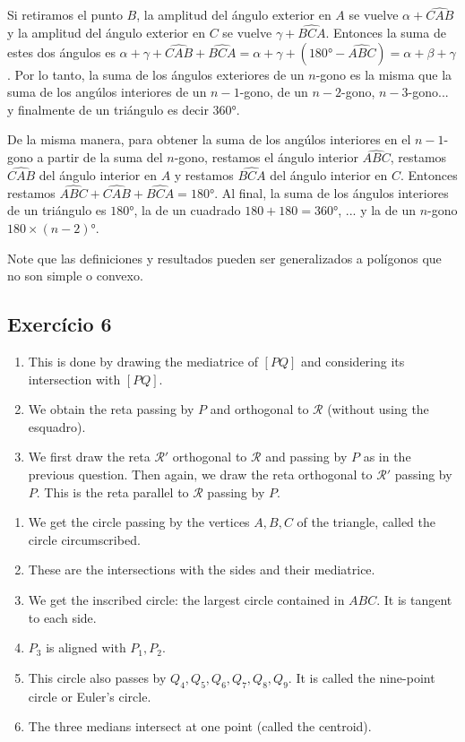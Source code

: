 Si retiramos el punto $B$, la amplitud del ángulo exterior en $A$ se vuelve
$\alpha + \widehat{CAB}$ y la amplitud del ángulo exterior en $C$ se vuelve
$\gamma + \widehat{BCA}$. Entonces la suma de estes dos ángulos es
$\alpha + \gamma + \widehat{CAB} + \widehat{BCA} =
\alpha + \gamma + {(180° - \widehat{ABC})} = \alpha+\beta+\gamma$.
Por lo tanto, la suma de los ángulos exteriores de un
$n$-gono es la misma que la suma de los angúlos interiores de un $n-1$-gono,
de un $n-2$-gono, $n-3$-gono... y finalmente de un triángulo es decir 360°.

De la misma manera, para obtener la suma de los angúlos interiores en el
$n-1$-gono a partir de la suma del $n$-gono,
restamos el ángulo interior $\widehat{ABC}$,
restamos $\widehat{CAB}$ del ángulo interior en $A$ y
restamos $\widehat{BCA}$ del ángulo interior en $C$. Entonces restamos
$\widehat{ABC}+\widehat{CAB}+\widehat{BCA}=180°$. Al final,
la suma de los ángulos interiores de un triángulo es $180°$, la de un
cuadrado $180+180=360°$, ... y la de un $n$-gono $180\times {(n-2)}$°.

Note que las definiciones y resultados pueden ser generalizados a polígonos
que no son simple o convexo.


\subsection*{Exercício 6}

\begin{enumerate}
\item This is done by drawing the mediatrice of $[PQ]$ and considering its
  intersection with $[PQ]$.
\item We obtain the reta passing by $P$ and orthogonal to $\mathcal{R}$
  (without using the esquadro).
\item We first draw the reta $\mathcal{R'}$ orthogonal to $\mathcal{R}$
  and passing by $P$ as in the previous question. Then again, we draw the
  reta orthogonal to $\mathcal{R'}$ passing by $P$. This is the reta parallel
  to $\mathcal{R}$ passing by $P$.
\end{enumerate}

\begin{enumerate}
\item We get the circle passing by the vertices $A,B,C$ of the triangle,
  called the circle circumscribed.
\item These are the intersections with the sides and their mediatrice.
\item We get the inscribed circle: the largest circle contained in $ABC$.
  It is tangent to each side.
\item $P_3$ is aligned with $P_1,P_2$.
\item This circle also passes by $Q_4,Q_5,Q_6,Q_7,Q_8,Q_9$. It is called
  the nine-point circle or Euler's circle.
\item The three medians intersect at one point (called the centroid).
\end{enumerate}

